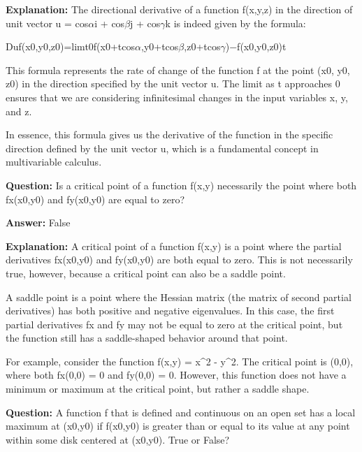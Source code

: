 \documentclass{article}
\begin{document}
                \textbf{Explanation:} The directional derivative of a function f(x,y,z) in the direction of unit vector u = cos\ensuremath{\alpha}i + cos\ensuremath{\beta}j + cos\ensuremath{\gamma}k is indeed given by the formula:

Duf(x0,y0,z0)=limt{\textrightarrow}0f(x0+tcos\ensuremath{\alpha},y0+tcos\ensuremath{\beta},z0+tcos\ensuremath{\gamma})\ensuremath{-}f(x0,y0,z0)t

This formula represents the rate of change of the function f at the point (x0, y0, z0) in the direction specified by the unit vector u. The limit as t approaches 0 ensures that we are considering infinitesimal changes in the input variables x, y, and z.

In essence, this formula gives us the derivative of the function in the specific direction defined by the unit vector u, which is a fundamental concept in multivariable calculus.
                
                \vspace{0.5cm} 
        
            
                \textbf {Question:} Is a critical point of a function f(x,y) necessarily the point where both fx(x0,y0) and fy(x0,y0) are equal to zero?
                
                \textbf{Answer:} False

                \textbf{Explanation:} A critical point of a function f(x,y) is a point where the partial derivatives fx(x0,y0) and fy(x0,y0) are both equal to zero. This is not necessarily true, however, because a critical point can also be a saddle point.

A saddle point is a point where the Hessian matrix (the matrix of second partial derivatives) has both positive and negative eigenvalues. In this case, the first partial derivatives fx and fy may not be equal to zero at the critical point, but the function still has a saddle-shaped behavior around that point.

For example, consider the function f(x,y) = x{\textasciicircum}2 - y{\textasciicircum}2. The critical point is (0,0), where both fx(0,0) = 0 and fy(0,0) = 0. However, this function does not have a minimum or maximum at the critical point, but rather a saddle shape.
                
                \vspace{0.5cm} 
        
            
                \textbf {Question:} A function f that is defined and continuous on an open set has a local maximum at (x0,y0) if f(x0,y0) is greater than or equal to its value at any point within some disk centered at (x0,y0). True or False?
                
\end{document}
